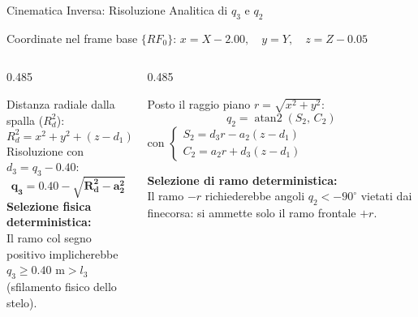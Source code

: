 \documentclass[aspectratio=169, 10pt]{beamer}
\DeclareMathOperator{\atanTwo}{atan2}
\newcommand{\formulaStrip}[1]{%
    \begin{tcolorbox}[
        enhanced, colback=UniPgNavy!6, colframe=UniPgNavy!20,
        boxrule=0.5pt, arc=3pt, boxsep=0pt,
        left=6pt, right=6pt, top=3.5pt, bottom=3.5pt,
        halign=center
    ]
        #1
    \end{tcolorbox}%
}
\begin{document}
\begin{frame}{Cinematica Inversa: Risoluzione Analitica di $q_3$ e $q_2$}
    \vspace{-0.10cm}
    \formulaStrip{\footnotesize\color{UniPgNavy}
        Coordinate nel frame base $\{RF_0\}$: \quad $x = X - 2.00, \quad y = Y, \quad z = Z - 0.05$
    }

    \vspace{0.12cm}
    \begin{columns}[onlytextwidth, T]
        \begin{column}{0.485\textwidth}
            \begin{tcolorbox}[moderncard, title={\color{UniPgNavy}1. Giunto Prismatico ($q_3$)}, equal height group=ik_cards]
                \footnotesize
                Distanza radiale dalla spalla ($R_d^2$):
                \vspace{-0.08cm}
                \[
                    R_d^2 = x^2 + y^2 + (z - d_1)^2 = a_2^2 + d_3^2
                \]
                Risoluzione con $d_3 = q_3 - 0.40$:
                \vspace{-0.05cm}
                \[
                    \mathbf{q_3 = 0.40 - \sqrt{R_d^2 - a_2^2}}
                \]
                \textbf{Selezione fisica deterministica:}\\
                Il ramo col segno positivo implicherebbe \\
                $q_3 \ge 0.40\text{ m} > l_3$ (sfilamento fisico dello stelo).
            \end{tcolorbox}
        \end{column}

        \begin{column}{0.485\textwidth}
            \begin{tcolorbox}[moderncard, title={\color{TechCyan}2. Giunto di Spalla ($q_2$)}, equal height group=ik_cards]
                \footnotesize
                Posto il raggio piano $r = \sqrt{x^2 + y^2}$:
                \vspace{-0.08cm}
                \[
                    q_2 = \atanTwo(S_2, \, C_2)
                \]
                con $\begin{cases} S_2 = d_3 r - a_2(z - d_1) \\ C_2 = a_2 r + d_3(z - d_1) \end{cases}$

                \vspace{0.08cm}
                \textbf{Selezione di ramo deterministica:}\\
                Il ramo $-r$ richiederebbe angoli $q_2 < -90^\circ$ vietati dai finecorsa: si ammette solo il ramo frontale $+r$.
            \end{tcolorbox}
        \end{column}
    \end{columns}
\end{frame}
\end{document}
